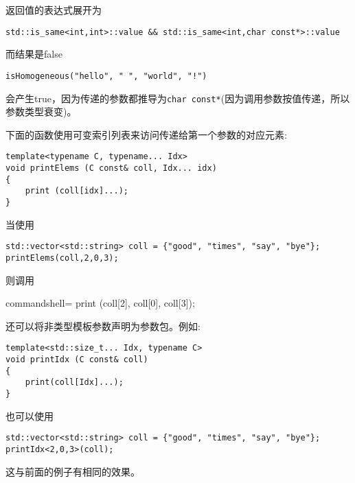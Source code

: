 返回值的表达式展开为

\begin{lstlisting}[style=styleCXX]
std::is_same<int,int>::value && std::is_same<int,char const*>::value
\end{lstlisting}

而结果是false

\begin{lstlisting}[style=styleCXX]
isHomogeneous("hello", " ", "world", "!")
\end{lstlisting}

会产生true，因为传递的参数都推导为\texttt{char const*}(因为调用参数按值传递，所以参数类型衰变)。


下面的函数使用可变索引列表来访问传递给第一个参数的对应元素:

\begin{lstlisting}[style=styleCXX]
template<typename C, typename... Idx>
void printElems (C const& coll, Idx... idx)
{
	print (coll[idx]...);
}
\end{lstlisting}

当使用

\begin{lstlisting}[style=styleCXX]
std::vector<std::string> coll = {"good", "times", "say", "bye"};
printElems(coll,2,0,3);
\end{lstlisting}

则调用

\begin{tcblisting}{commandshell={}}
print (coll[2], coll[0], coll[3]);
\end{tcblisting}

还可以将非类型模板参数声明为参数包。例如:

\begin{lstlisting}[style=styleCXX]
template<std::size_t... Idx, typename C>
void printIdx (C const& coll)
{
	print(coll[Idx]...);
}
\end{lstlisting}

也可以使用

\begin{lstlisting}[style=styleCXX]
std::vector<std::string> coll = {"good", "times", "say", "bye"};
printIdx<2,0,3>(coll);
\end{lstlisting}

这与前面的例子有相同的效果。


